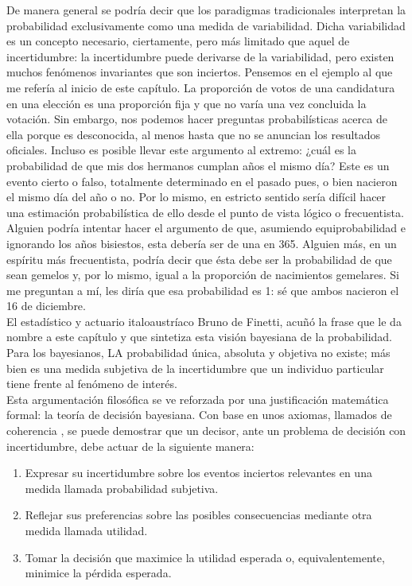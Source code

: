 	De manera general se podría decir que los paradigmas tradicionales interpretan la probabilidad exclusivamente como una medida de variabilidad. Dicha variabilidad es un concepto necesario, ciertamente, pero más limitado que aquel de incertidumbre: la incertidumbre puede derivarse de la variabilidad, pero existen muchos fenómenos invariantes que son inciertos. Pensemos en el ejemplo al que me refería al inicio de este capítulo. La proporción de votos de una candidatura en una elección es una proporción fija y que no varía una vez concluida la votación. Sin embargo, nos podemos hacer preguntas probabilísticas acerca de ella porque es desconocida, al menos hasta que no se anuncian los resultados oficiales. Incluso es posible llevar este argumento al extremo: ¿cuál es la probabilidad de que mis dos hermanos cumplan años el mismo día? Este es un evento cierto o falso, totalmente determinado en el pasado pues, o bien nacieron el mismo día del año o no. Por lo mismo, en estricto sentido sería difícil hacer una estimación probabilística de ello desde el punto de vista lógico o frecuentista. Alguien podría intentar hacer el argumento de que, asumiendo equiprobabilidad e ignorando los años bisiestos, esta debería ser de una en 365. Alguien más, en un espíritu más frecuentista, podría decir que ésta debe ser la probabilidad de que sean gemelos y, por lo mismo, igual a la proporción de nacimientos gemelares. Si me preguntan a mí, les diría que esa probabilidad es 1: sé que ambos nacieron el 16 de diciembre.\\	
	
	El estadístico y actuario italoaustríaco Bruno de Finetti, acuñó la frase que le da nombre a este capítulo y que sintetiza esta visión bayesiana de la probabilidad. Para los bayesianos, LA probabilidad única, absoluta y objetiva no existe; más bien es una medida subjetiva de la incertidumbre que un individuo particular tiene frente al fenómeno de interés.\\ 
	
	
	Esta argumentación filosófica se ve reforzada por una justificación matemática formal: la teoría de decisión bayesiana. Con base en unos axiomas, llamados de coherencia , se puede demostrar que un decisor, ante un problema de decisión con incertidumbre, debe actuar de la siguiente manera:

\begin{enumerate}
\item Expresar su incertidumbre sobre los eventos inciertos relevantes en una medida llamada probabilidad subjetiva.
\item Reflejar sus preferencias sobre las posibles consecuencias mediante otra medida llamada utilidad. 
\item Tomar la decisión que maximice la utilidad esperada o, equivalentemente, minimice la pérdida esperada. 
\end{enumerate}   
	

